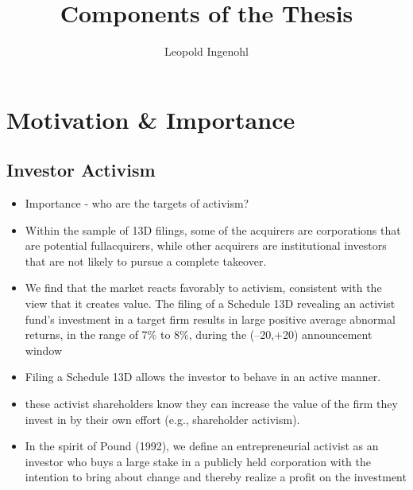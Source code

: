 \documentclass[12pt]{article}
\title{Components of the Thesis}
\author{Leopold Ingenohl}
\begin{document}
\maketitle

\pagebreak

\tableofcontents

\pagebreak

\section{Motivation \& Importance} 

\subsection{Investor Activism}

    \begin{itemize}
        
        \item Importance - who are the targets of activism? \citep{CoffeeJr.2014}
        
        \item Within the sample of 13D filings, some of the acquirers are corporations that are potential fullacquirers, while other acquirers are institutional investors that are not likely to pursue a complete takeover. \citep{Brigida2012}

        \item We find that the market reacts favorably to activism, consistent with the view that it creates value. The filing of a Schedule 13D revealing an activist fund’s investment in a target firm results in large positive average abnormal returns, in the range of 7\% to 8\%, during the (–20,+20) announcement window \citep{Brav2008}

        \item Filing a Schedule 13D allows the investor to behave in an active manner. \citep{Brigida2012}

        \item these activist shareholders know they can increase the value of the firm they invest in by their own effort (e.g., shareholder activism).\citep{Collin-Dufresne2015}

        \item In the spirit of Pound (1992), we define an entrepreneurial activist as an investor who buys a large stake in a publicly held corporation with the intention to bring about change and thereby realize a profit on the investment \citep{Klein2009}


\end{itemize}
\end{document}
